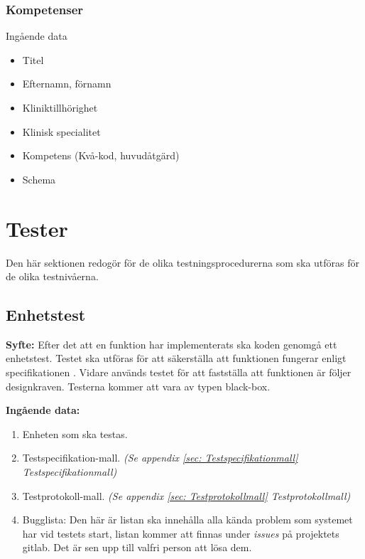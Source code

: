 \documentclass[a4paper,10pt, twoside]{article}
\begin{document}
\subsubsection{Kompetenser}
\label{sec: Kompetenser}
Ingående data
\begin{multicols}{2}
\begin{itemize}
	\item Titel
	\item Efternamn, förnamn
	\item Kliniktillhörighet
	\item Klinisk specialitet
	\item Kompetens (Kvå-kod, huvudåtgärd)
	\item Schema
\end{itemize}
\end{multicols}

\section{Tester}
Den här sektionen redogör för de olika testningsprocedurerna som ska utföras för de olika testnivåerna.

\subsection{Enhetstest}
\label{sec:Enhetstest}
\textbf{Syfte:} Efter det att en funktion har implementerats ska koden genomgå ett enhetstest. Testet ska utföras för att säkerställa att funktionen fungerar enligt specifikationen \cite{kravspec}. Vidare används testet för att fastställa att funktionen är följer designkraven. Testerna kommer att vara av typen black-box.

\textbf{Ingående data:}
	\begin{enumerate}
    	\item Enheten som ska testas.
      	\item Testspecifikation-mall. \emph{(Se appendix \ref{sec: Testspecifikationmall} Testspecifikationmall)}
      	\item Testprotokoll-mall. \emph{(Se appendix \ref{sec: Testprotokollmall} Testprotokollmall)}
      	\item Bugglista: Den här är listan ska innehålla alla kända problem som systemet har vid testets start, listan 					  kommer att finnas under \emph{issues} på projektets gitlab. Det är sen upp till valfri person att lösa dem.
    \end{enumerate}
\end{document}
